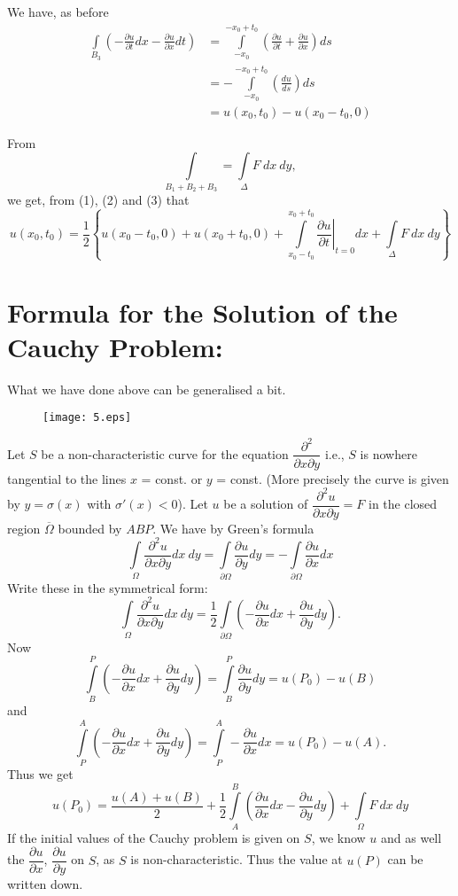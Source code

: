 \begin{coro*}
\begin{enumerate}
We have, as before
\begin{align*}
\int\limits_{B_{3}}\left(-\frac{\partial u}{\partial t}dx-\frac{\partial u}{\partial x}dt\right) &= \int\limits^{-x_{0}+t_{0}}_{-x_{0}}\left(\frac{\partial u}{\partial t}+\frac{\partial u}{\partial x}\right)ds\\[4pt]
&= -\int\limits^{-x_{0}+t_{0}}_{-x_{0}}\left(\frac{du}{ds}\right)ds\\[4pt]
&= u(x_{0},t_{0})-u(x_{0}-t_{0},0)
\end{align*}
\end{enumerate}

From\pageoriginale
$$
\int\limits_{B_{1}+B_{2}+B_{3}}=\int\limits_{\Delta}F \ dx \ dy,
$$
we get, from (1), (2) and (3) that
$$
u(x_{0},t_{0})=\frac{1}{2}\left\{u(x_{0}-t_{0},0)+u(x_{0}+t_{0},0)+\int\limits^{x_{0}+t_{0}}_{x_{0}-t_{0}}\left.\frac{\partial u}{\partial t}\right|_{t=0}dx+\int\limits_{\Delta} F \ dx \ dy\right\}
$$
\end{coro*}

\section*{Formula for the Solution of the Cauchy Problem:}\pageoriginale

What we have done above can be generalised a bit.
\begin{figure}[H]
\centering
\texttt{[image: 5.eps]}
\end{figure}

Let $S$ be a non-characteristic curve for the equation $\dfrac{\partial^{2}}{\partial x \partial y}$ i.e., $S$ is nowhere tangential to the lines $x$ = const. or $y$ = const. (More precisely the curve is given by $y=\sigma(x)$ with $\sigma'(x)<0$). Let $u$ be a solution of $\dfrac{\partial^{2}u}{\partial x\partial y}=F$ in the closed region $\overline{\Omega}$ bounded by $ABP$. We have by Green's formula
$$
\int\limits_{\Omega}\frac{\partial^{2}u}{\partial x\partial y}dx \ dy =\int\limits_{\partial\Omega}\frac{\partial u}{\partial y}dy=-\int\limits_{\partial \Omega}\frac{\partial u}{\partial x}dx
$$
Write these in the symmetrical form:
$$
\int\limits_{\Omega}\frac{\partial^{2}u}{\partial x\partial y}dx \ dy =\frac{1}{2}\int\limits_{\partial \Omega}\left(-\frac{\partial u}{\partial x}dx+\frac{\partial u}{\partial y}dy\right).
$$
Now
$$
\int\limits^{P}_{B}\left(-\frac{\partial u}{\partial x}dx+\frac{\partial u}{\partial y}dy\right)=\int\limits^{P}_{B}\frac{\partial u}{\partial y}dy=u(P_{0})-u(B)
$$
and
$$
\int\limits^{A}_{P}\left(-\frac{\partial u}{\partial x}dx+\frac{\partial u}{\partial y}dy\right)=\int\limits^{A}_{P}-\frac{\partial u}{\partial x}dx=u(P_{0})-u(A).
$$
Thus we get
$$
u(P_{0})=\frac{u(A)+u(B)}{2}+\frac{1}{2}\int\limits^{B}_{A}\left(\frac{\partial u}{\partial x}dx-\frac{\partial u}{\partial y}dy\right)+\int\limits_{\Omega}F \ dx \ dy
$$
If the initial values of the Cauchy problem is given on $S$, we know $u$ and as well the $\dfrac{\partial u}{\partial x}$, $\dfrac{\partial u}{\partial y}$ on $S$, as $S$ is non-characteristic. Thus the value at $u(P)$ can be written down.

